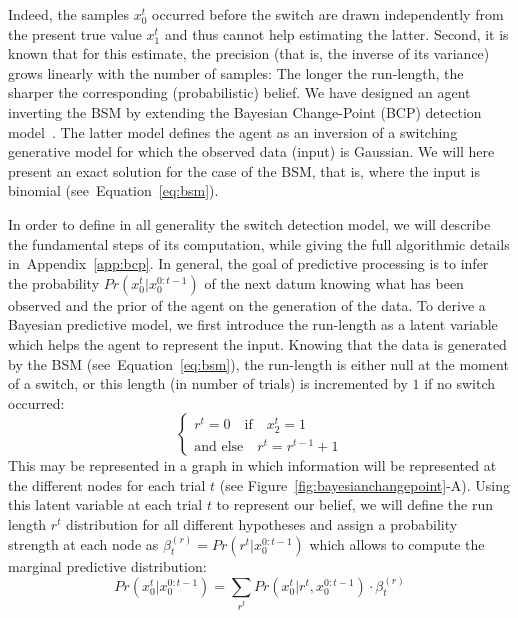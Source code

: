 \documentclass[12pt,english]{article}%
\newcommand{\choice}[1]{ %
	\left\{ %
		\begin{array}{l} #1 \end{array} %
	\right. }
\newcommand{\eql}[1]{\begin{equation}#1\end{equation}}
\newcommand{\citep}[1]{\parencite{#1}}
\newcommand{\seeFig}[1]{Figure~\ref{fig:#1}}
\newcommand{\seeEq}[1]{Equation~\ref{eq:#1}}
\newcommand{\seeApp}[1]{Appendix~\ref{app:#1}}
\begin{document}
Indeed, the samples $x_0^t$ occurred before the switch are drawn independently from the present true value $x_1^t$
and thus cannot help estimating the latter.
Second, it is known that for this estimate, the precision
(that is, the inverse of its variance)
grows linearly with the number of samples:
The longer the run-length, the sharper the corresponding (probabilistic) belief.
We have designed an agent inverting the BSM by extending
the Bayesian Change-Point (BCP) detection model~\citep{AdamsMackay2007}.
The latter model defines the agent as an inversion of a switching generative model
for which the observed data (input) is Gaussian.
We will here present an exact solution for the case of the BSM,
that is, where the input is binomial (see~\seeEq{bsm}).

In order to define in all generality the switch detection model,
we will describe the fundamental steps of its computation,
while giving the full algorithmic details in~\seeApp{bcp}.
In general, the goal of predictive processing
is to infer the probability $Pr(x_0^t | x_0^{0:t-1})$ of the next datum
knowing what has been observed and
the prior of the agent on the generation of the data.
To derive a Bayesian predictive model, we first introduce
the run-length as a latent variable which helps the agent to represent the input.
Knowing that the data is generated by the BSM (see~\seeEq{bsm}),
the run-length is either null at the moment of a switch,
or this length (in number of trials) is incremented by $1$ if no switch occurred:
\eql{\choice{
r^t = 0 \quad \text{if} \quad x_2^t=1 \\
\text{and else} \quad r^t = r^{t-1} +1 }\label{eq:run_length}}%
This may be represented in a graph
in which information will be represented at the different nodes for each trial $t$ (see \seeFig{bayesianchangepoint}-A).
Using this latent variable at each trial $t$ to represent our belief,
we will define the run length $r^t$ distribution
for all different hypotheses
and assign a probability strength at each node
as $\beta^{(r)}_t=Pr(r^t | x_0^{0:t-1})$
which allows to compute the marginal predictive distribution:
\eql{
Pr(x_0^t | x_0^{0:t-1}) = \sum_{r^{t}} Pr(x_0^t | r^{t}, x_0^{0:t-1}) \cdot  \beta^{(r)}_t
\label{eq:pred}
}
\end{document}
